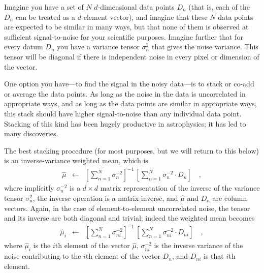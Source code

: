 \documentclass[12pt]{article}
\begin{document}
Imagine you have a set of $N$ $d$-dimensional data points $D_n$ (that
is, each of the $D_n$ can be treated as a $d$-element vector), and
imagine that these $N$ data points are expected to be similar in many
ways, but that none of them is observed at sufficient signal-to-noise
for your scientific purposes.  Imagine further that for every datum
$D_n$ you have a variance tensor $\sigma^2_n$ that gives the noise
variance.  This tensor will be diagonal if there is independent noise
in every pixel or dimension of the vector.

One option you have---to find the signal in the noisy data---is to
stack or co-add or average the data points.  As long as the noise in
the data is uncorrelated in appropriate ways, and as long as the data
points are similar in appropriate ways, this stack should have higher
signal-to-noise than any individual data point.  Stacking of this kind
has been hugely productive in astrophysics; it has led to many
discoveries.

The best stacking procedure (for most purposes, but we will return to
this below) is an inverse-variance weighted mean, which is
\begin{eqnarray}\label{eq:stack}
\hat{\mu}
 &\leftarrow&
\left[\sum_{n=1}^N \sigma^{-2}_n\right]^{-1}\,\left[\sum_{n=1}^N \sigma^{-2}_n\cdot D_n\right]
 \quad ,
\end{eqnarray}
where implicitly $\sigma^{-2}_n$ is a $d\times d$ matrix
representation of the inverse of the variance tensor $\sigma^2_n$, the
inverse operation is a matrix inverse, and $\hat{\mu}$ and $D_n$ are
column vectors.  Again, in the case of element-to-element uncorrelated
noise, the tensor and its inverse are both diagonal and trivial;
indeed the weighted mean becomes
\begin{eqnarray}
\hat{\mu}_i
 &\leftarrow&
\left[\sum_{n=1}^N \sigma^{-2}_{ni}\right]^{-1}\,\left[\sum_{n=1}^N \sigma^{-2}_{ni}\cdot D_{ni}\right]
 \quad ,
\end{eqnarray}
where $\hat{\mu}_i$ is the $i$th element of the vector $\hat{\mu}$,
$\sigma^{-2}_{ni}$ is the inverse variance of the noise contributing
to the $i$th element of the vector $D_n$, and $D_{ni}$ is that $i$th
element.
\end{document}

